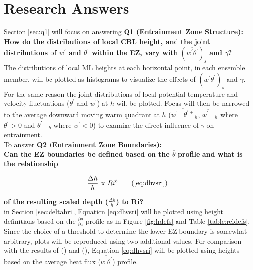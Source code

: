 
\chapter{Research Answers}
\label{ch:results}
\setlength{\parindent}{0cm}

Section \ref{sec:q1} will focus on answering \textbf{Q1 (Entrainment Zone Structure):} \\ 

\textbf{How do the distributions of local \acs{CBL} height, and the joint distributions of $w^{'}$ and $\theta^{'}$ within the \acs{EZ}, vary with $(\overline{w^{'}\theta^{'}})_{s}$ and $\gamma$?}\\

The distributions of local \acs{ML} heights at each horizontal point, in each ensemble member, will be plotted as histograms to visualize the effects of $(\overline{w^{'}\theta^{'}})_{s}$ and $\gamma$.  For the same reason the joint distributions of local potential temperature and velocity fluctuations ($\theta^{'}$ and $w^{'}$) at $h$ will be plotted.  Focus will then be narrowed to the average downward moving warm quadrant at $h$ ($\overline{w^{'-}\theta^{'+}}_{h}$, $\overline{w^{'-}}_{h}$  where $ \theta^{'} >0$ and $\overline{\theta^{'+}}_{h} $ where $ w^{'} < 0 $) to examine the direct influence of $\gamma$ on entrainment.\\       

To answer \textbf{Q2 (Entrainment Zone Boundaries):}\\ 

\textbf{Can the \acs{EZ} boundaries be defined based on the $\overline{\theta}$ profile and what is the relationship} 

\begin{equation}
\frac{\Delta h}{h} \propto Ri^{b}\tag{\ref{eq:dhvsri}}
\end{equation}

\textbf{of the resulting scaled depth ($\frac{\Delta h}{h}$) to \acs{Ri}?}\\

in Section \ref{sec:deltahri}, Equation \ref{eq:dhvsri} will be plotted using height definitions based on the $\frac{\partial \overline{\theta}}{\partial z}$ profile as in Figure \ref{fig:hdefs} and Table \ref{table:reldefs}.  Since the choice of a threshold to determine the lower \acs{EZ} boundary is somewhat arbitrary, plots will be reproduced using two additional values. For comparison with the results of \citeauthor{FedConzMir04} (\citeyear{FedConzMir04}) and \citeauthor{BrooksFowler2} (\citeyear{BrooksFowler2}), Equation \ref{eq:dhvsri} will be plotted using heights based on the average heat flux ($\overline{w^{'}\theta^{'}}$) profile.\\   

